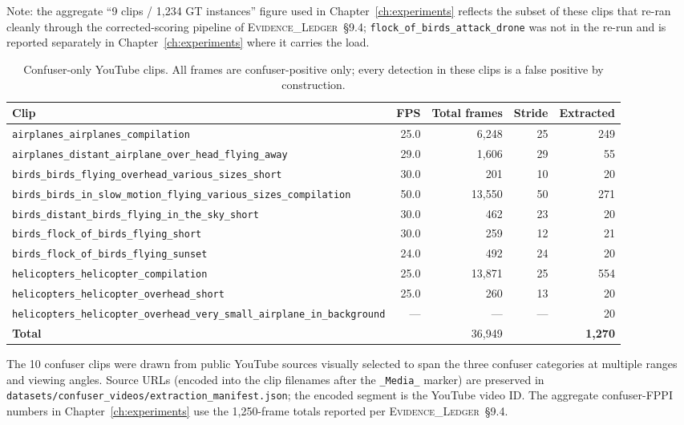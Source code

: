 \documentclass[12pt,a4paper,oneside,openright]{book}
\begin{document}
\noindent Note: the aggregate ``9 clips / 1{,}234 GT instances'' figure used in Chapter~\ref{ch:experiments} reflects the subset of these clips that re-ran cleanly through the corrected-scoring pipeline of \textsc{Evidence\_Ledger}~\S9.4; \texttt{flock\_of\_birds\_attack\_drone} was not in the re-run and is reported separately in Chapter~\ref{ch:experiments} where it carries the load.

\begin{table}[htbp]
    \centering
    \caption{Confuser-only YouTube clips. All frames are confuser-positive only; every detection in these clips is a false positive by construction.}
    \label{tab:youtube_confuser_clips}
    \begin{tabular}{lrrrr}
        \toprule
        Clip & FPS & Total frames & Stride & Extracted \\
        \midrule
        \texttt{airplanes\_airplanes\_compilation}             & 25.0 & 6{,}248 & 25 & 249 \\
        \texttt{airplanes\_distant\_airplane\_over\_head\_flying\_away} & 29.0 & 1{,}606 & 29 & 55 \\
        \texttt{birds\_birds\_flying\_overhead\_various\_sizes\_short} & 30.0 & 201 & 10 & 20 \\
        \texttt{birds\_birds\_in\_slow\_motion\_flying\_various\_sizes\_compilation} & 50.0 & 13{,}550 & 50 & 271 \\
        \texttt{birds\_distant\_birds\_flying\_in\_the\_sky\_short} & 30.0 & 462 & 23 & 20 \\
        \texttt{birds\_flock\_of\_birds\_flying\_short}        & 30.0 & 259 & 12 & 21 \\
        \texttt{birds\_flock\_of\_birds\_flying\_sunset}      & 24.0 & 492 & 24 & 20 \\
        \texttt{helicopters\_helicopter\_compilation}          & 25.0 & 13{,}871 & 25 & 554 \\
        \texttt{helicopters\_helicopter\_overhead\_short}      & 25.0 & 260 & 13 & 20 \\
        \texttt{helicopters\_helicopter\_overhead\_very\_small\_airplane\_in\_background} & --- & --- & --- & 20 \\
        \midrule
        \textbf{Total} & & 36{,}949 & & \textbf{1{,}270} \\
        \bottomrule
    \end{tabular}
\end{table}

\noindent The 10 confuser clips were drawn from public YouTube sources visually selected to span the three confuser categories at multiple ranges and viewing angles. Source URLs (encoded into the clip filenames after the \texttt{\_Media\_} marker) are preserved in \texttt{datasets/confuser\_videos/extraction\_manifest.json}; the encoded segment is the YouTube video ID. The aggregate confuser-FPPI numbers in Chapter~\ref{ch:experiments} use the 1{,}250-frame totals reported per \textsc{Evidence\_Ledger}~\S9.4.
\end{document}
